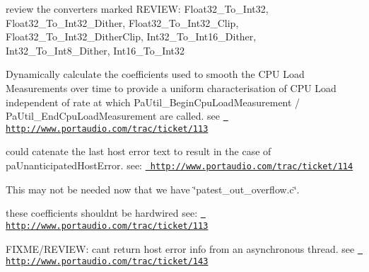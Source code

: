 \begin{DoxyRefList}
\label{todo__todo000004}%
%
review the converters marked REVIEW\+: Float32\+\_\+\+To\+\_\+\+Int32, Float32\+\_\+\+To\+\_\+\+Int32\+\_\+\+Dither, Float32\+\_\+\+To\+\_\+\+Int32\+\_\+\+Clip, Float32\+\_\+\+To\+\_\+\+Int32\+\_\+\+Dither\+Clip, Int32\+\_\+\+To\+\_\+\+Int16\+\_\+\+Dither, Int32\+\_\+\+To\+\_\+\+Int8\+\_\+\+Dither, Int16\+\_\+\+To\+\_\+\+Int32  
\item[File \mbox{\hyperlink{pa__cpuload_8c}{pa\+\_\+cpuload.c}} ]\label{todo__todo000005}%
%
Dynamically calculate the coefficients used to smooth the CPU Load Measurements over time to provide a uniform characterisation of CPU Load independent of rate at which Pa\+Util\+\_\+\+Begin\+Cpu\+Load\+Measurement / Pa\+Util\+\_\+\+End\+Cpu\+Load\+Measurement are called. see \href{http://www.portaudio.com/trac/ticket/113}{\texttt{ http\+://www.\+portaudio.\+com/trac/ticket/113}}  
\item[Member \mbox{\hyperlink{pa__front_8c_ae84ae07ba25bf959e00f3b0ab4d17acb}{Pa\+\_\+\+Get\+Error\+Text}} (Pa\+Error error\+Code)]\label{todo__todo000008}%
%
could catenate the last host error text to result in the case of pa\+Unanticipated\+Host\+Error. see\+: \href{http://www.portaudio.com/trac/ticket/114}{\texttt{ http\+://www.\+portaudio.\+com/trac/ticket/114}}  
\item[File \mbox{\hyperlink{patest__toomanysines_8c}{patest\+\_\+toomanysines.c}} ]\label{todo__todo000037}%
%
This may not be needed now that we have \char`\"{}patest\+\_\+out\+\_\+overflow.\+c\char`\"{}.  
\item[Member \mbox{\hyperlink{pa__cpuload_8h_a8c29cc1cf3b6fd9bf18a2c3fc9f0ef2a}{Pa\+Util\+\_\+\+End\+Cpu\+Load\+Measurement}} (\mbox{\hyperlink{struct_pa_util_cpu_load_measurer}{Pa\+Util\+Cpu\+Load\+Measurer}} $\ast$measurer, unsigned long frames\+Processed)]\label{todo__todo000006}%
%
these coefficients shouldn\textquotesingle{}t be hardwired see\+: \href{http://www.portaudio.com/trac/ticket/113}{\texttt{ http\+://www.\+portaudio.\+com/trac/ticket/113}}  
\item[Member \mbox{\hyperlink{pa__win__wmme_8c_af8f8a8ef4c1f1a39686109801807a4ee}{Processing\+Thread\+Proc}} (void $\ast$p\+Arg)]\label{todo__todo000023}%
%
FIXME/\+REVIEW\+: can\textquotesingle{}t return host error info from an asynchronous thread. see \href{http://www.portaudio.com/trac/ticket/143}{\texttt{ http\+://www.\+portaudio.\+com/trac/ticket/143}} 


\end{DoxyRefList}
